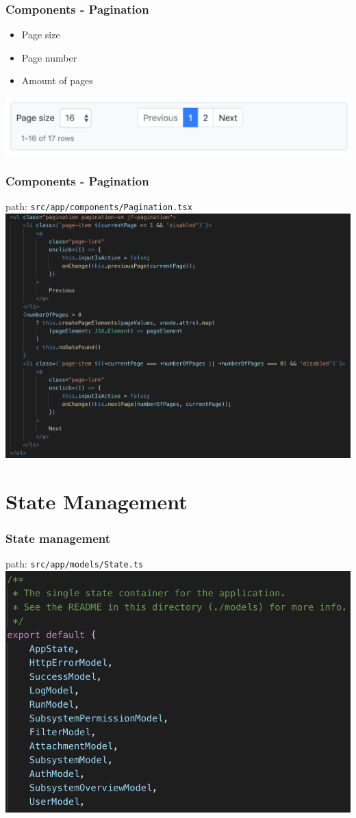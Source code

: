 \documentclass[12pt]{beamer}
\begin{document}
	\begin{frame}
		\frametitle{Components - Pagination}
		\begin{itemize}
			\item Page size
			\item Page number
			\item Amount of pages
		\end{itemize}
		\includegraphics[scale=.4]{../assets/pagination-element.png}
	\end{frame}

	\begin{frame}
		\frametitle{Components - Pagination}
		path: \texttt{src/app/components/Pagination.tsx}
		\includegraphics[scale=.3]{../assets/pagination-component.png}
	\end{frame}

	\section{State Management}
	\begin{frame}
		\frametitle{State management}
		path: \texttt{src/app/models/State.ts}
		\includegraphics[scale=.5]{../assets/ui-state.png}
	\end{frame}
\end{document}
